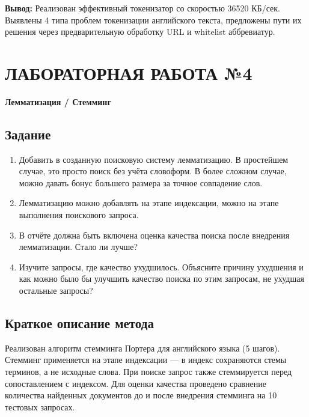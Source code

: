 \documentclass[a4paper, 12pt]{article}
\begin{document}
\textbf{Вывод:} Реализован эффективный токенизатор со скоростью 36520 КБ/сек. Выявлены 4 типа проблем токенизации английского текста, предложены пути их решения через предварительную обработку URL и whitelist аббревиатур.

\newpage

\section*{ЛАБОРАТОРНАЯ РАБОТА №4}
\textbf{Лемматизация / Стемминг}

\subsection*{Задание}
\begin{enumerate}
    \item Добавить в созданную поисковую систему лемматизацию. В простейшем случае, это просто поиск без учёта словоформ. В более сложном случае, можно давать бонус большего размера за точное совпадение слов.
    \item Лемматизацию можно добавлять на этапе индексации, можно на этапе выполнения поискового запроса.
    \item В отчёте должна быть включена оценка качества поиска после внедрения лемматизации. Стало ли лучше?
    \item Изучите запросы, где качество ухудшилось. Объясните причину ухудшения и как можно было бы улучшить качество поиска по этим запросам, не ухудшая остальные запросы?
\end{enumerate}

\subsection*{Краткое описание метода}
Реализован алгоритм стемминга Портера для английского языка (5 шагов). Стемминг применяется на этапе индексации — в индекс сохраняются стемы терминов, а не исходные слова. При поиске запрос также стеммируется перед сопоставлением с индексом. Для оценки качества проведено сравнение количества найденных документов до и после внедрения стемминга на 10 тестовых запросах.
\end{document}
